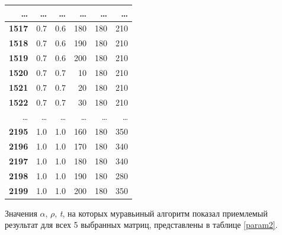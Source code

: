 \documentclass[a4paper,12pt]{article}
\begin{document}
\begin{table} [h!]
\begin{center}
\begin{tabular}{|r|r|r|r|r|r|}
\hline
\ldots & \ldots & \ldots & \ldots & \ldots & \ldots\\
\hline
{\bf 1517} &        0.7 &        0.6 &        180 &        180 &        210 \\
\hline
{\bf 1518} &        0.7 &        0.6 &        190 &        180 &        210 \\
\hline
{\bf 1519} &        0.7 &        0.6 &        200 &        180 &        210 \\
\hline
{\bf 1520} &        0.7 &        0.7 &         10 &        180 &        210 \\
\hline
{\bf 1521} &        0.7 &        0.7 &         20 &        180 &        210 \\
\hline
{\bf 1522} &        0.7 &        0.7 &         30 &        180 &        210 \\
\hline
\ldots & \ldots & \ldots & \ldots & \ldots & \ldots\\
\hline
{\bf 2195} &        1.0 &        1.0 &      160 &        180 &        350 \\
\hline
{\bf 2196} &        1.0 &        1.0 &      170 &        180 &        340 \\
\hline
{\bf 2197} &        1.0 &        1.0 &      180 &        180 &        340 \\
\hline
{\bf 2198} &        1.0 &        1.0 &      190 &        180 &        280 \\
\hline
{\bf 2199} &        1.0 &        1.0 &      200 &        180 &        350 \\
\hline
\end{tabular}  
\label{param3}
\end{center}
\end{table} 
\pagebreak

\newpage
\mbox{}
\newpage
\mbox{}
\newpage

Значения $\alpha$, $\rho$, \textit{t}, на которых муравьиный
алгоритм показал приемлемый результат для всех 5 выбранных матриц,
представлены в таблице \ref{param2}.

\pagebreak
\end{document}
